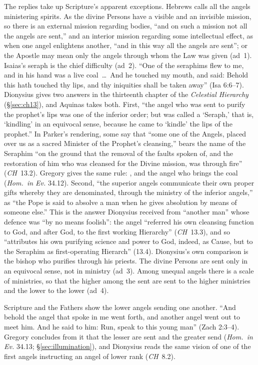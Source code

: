 The replies take up Scripture's apparent exceptions. Hebrews calls all the
angels ministering spirits. As the divine Persons have a visible and an
invisible mission, so there is an external mission regarding bodies, ``and
on such a mission not all the angels are sent,'' and an interior mission
regarding some intellectual effect, as when one angel enlightens another,
``and in this way all the angels are sent''; or the Apostle may mean only
the angels through whom the Law was given (ad~1). Isaias's seraph is the
chief difficulty (ad~2). ``One of the seraphims flew to me, and in his hand
was a live coal~\dots\ And he touched my mouth, and said: Behold this hath
touched thy lips, and thy iniquities shall be taken away'' (Isa 6:6--7).
Dionysius gives two answers in the thirteenth chapter of the
\emph{Celestial Hierarchy} (\S\ref{sec:ch13}), and Aquinas takes both.
First, ``the angel who was sent to purify the prophet's lips was one of
the inferior order; but was called a `Seraph,' that is, `kindling' in an
equivocal sense, because he came to `kindle' the lips of the prophet.'' In
Parker's rendering, some say that ``some one of the Angels, placed over us
as a sacred Minister of the Prophet's cleansing,'' bears the name of the
Seraphim ``on the ground that the removal of the faults spoken of, and the
restoration of him who was cleansed for the Divine mission, was through
fire'' (\emph{CH}~13.2). Gregory gives the same rule: ,
and the angel who brings the coal  (\emph{Hom.\ in Ev.} 34.12). Second, ``the superior angels
communicate their own proper gifts whereby they are denominated, through
the ministry of the inferior angels,'' as ``the Pope is said to absolve a
man when he gives absolution by means of someone else.'' This is the answer
Dionysius received from ``another man'' whose defence was ``by no means
foolish'': the angel ``referred his own cleansing function to God, and after
God, to the first working Hierarchy'' (\emph{CH}~13.3), and so ``attributes
his own purifying science and power to God, indeed, as Cause, but to the
Seraphim as first-operating Hierarch'' (13.4). Dionysius's own comparison
is the bishop who purifies through his priests. The divine Persons are
sent only in an equivocal sense, not in ministry (ad~3). Among unequal
angels there is a scale of ministries, so that the higher among the sent
are sent to the higher ministries and the lower to the lower (ad~4).

Scripture and the Fathers show the lower angels sending one another. ``And
behold the angel that spoke in me went forth, and another angel went out
to meet him. And he said to him: Run, speak to this young man'' (Zach
2:3--4). Gregory concludes from it that the lesser are sent and the greater
send (\emph{Hom.\ in Ev.} 34.13; \S\ref{sec:illumination}), and
Dionysius reads the same vision of one of the first angels instructing an
angel of lower rank (\emph{CH}~8.2).


